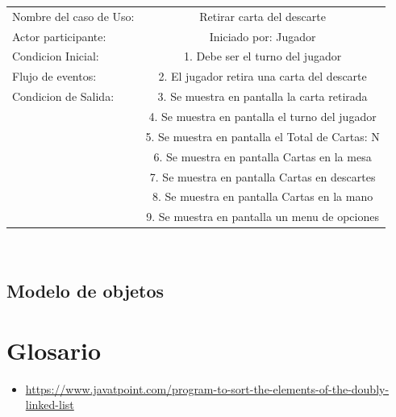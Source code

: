 \documentclass[60pt]{article}
\begin{document}
\begin{center}
    \begin{tabular}{ l | c  }
        
        Nombre del caso de Uso: & Retirar carta del descarte                      \\
        Actor participante:     & Iniciado por: Jugador                           \\\hline
        Condicion Inicial:      & 1. Debe ser el turno del jugador                \\
        Flujo de eventos:       & 2. El jugador retira una carta del descarte     \\\hline
        Condicion de Salida:    & 3. Se muestra en pantalla la carta retirada     \\
                                & 4. Se muestra en pantalla el turno del jugador  \\
                                & 5. Se muestra en pantalla el Total de Cartas: N \\
                                & 6. Se muestra en pantalla Cartas en la mesa     \\
                                & 7. Se muestra en pantalla Cartas en descartes   \\
                                & 8. Se muestra en pantalla Cartas en la mano     \\
                                & 9. Se muestra en pantalla un menu de opciones   \\ 
    \end{tabular} \\
\end{center}

\subsection{Modelo de objetos}\label{cap:modelo-objetos}

\section{Glosario}\label{cap:glosario}  

\begin{itemize}
    \item \url{https://www.javatpoint.com/program-to-sort-the-elements-of-the-doubly-linked-list}
\end{itemize}


% 
% 



\end{document}
